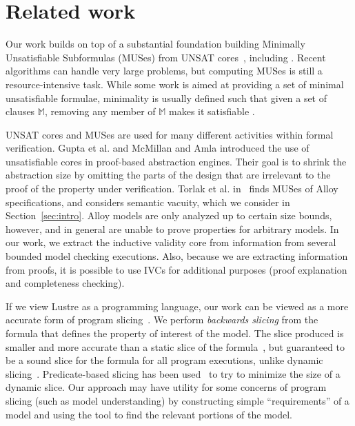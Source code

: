\section{Related work}
\label{sec:related}


Our work builds on top of a substantial foundation building Minimally Unsatisfiable Subformulas
(MUSes) from UNSAT cores~\cite{Cimatti2007:UNSAT}, including \cite{marques2010minimal, belov2012towards, ryvchin2011faster, belov2012computing, nadel2010boosting}.  Recent algorithms can handle very large problems, but computing MUSes is still a resource-intensive task.  While some work is aimed at providing a set of minimal unsatisfiable formulae, minimality is usually defined such that given a set of clauses $\mathbb{M}$, removing any member of $\mathbb{M}$ makes it satisfiable \cite{belov2012computing}.

UNSAT cores and MUSes are used for many different activities within formal verification.  Gupta et al. \cite{gupta2003iterative} and McMillan and Amla \cite{mcmillan2003automatic} introduced the use of unsatisfiable cores in proof-based abstraction engines. Their goal is to shrink the abstraction size by omitting the parts of the design that are irrelevant to the proof of the property under verification. Torlak et al. in~\cite{torlak2008finding} finds MUSes of Alloy specifications, and considers semantic vacuity, which we consider in Section~\ref{sec:intro}.  Alloy models are only analyzed up to certain size bounds, however, and in general are unable to prove properties for arbitrary models.  In our work, we extract the inductive validity core from information from several bounded model checking executions.  Also, because we are extracting information from proofs, it is possible to use IVCs for additional purposes (proof explanation and completeness checking).

If we view Lustre as a programming language, our work can be viewed as a more accurate form of program slicing~\cite{Tip95asurvey}.  We perform {\em backwards slicing} from the formula that defines the property of interest of the model.  The slice produced is smaller and more accurate than a static slice of the formula~\cite{Weiser:1981:slicing}, but guaranteed to be a sound slice for the formula for all program executions, unlike dynamic slicing~\cite{Agrawal:1990:slicing}.  Predicate-based slicing has been used~\cite{Li04:slicing} to try to minimize the size of a dynamic slice.  Our approach may have utility for some concerns of program slicing (such as model understanding) by constructing simple ``requirements'' of a model and using the tool to find the relevant portions of the model.

